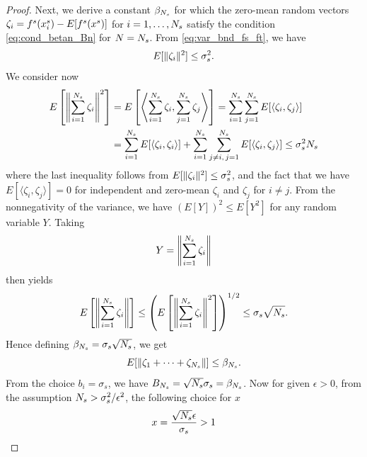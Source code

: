 \documentclass[review,supplement,onefignum,onetabnum]{siamonline250211}
\begin{document}
\begin{proof}
Next, we derive a constant $\beta_{N_s}$ for which the zero-mean random vectors $\zeta_i = f^s(x^s_i)- E[f^s(x^s)]$ for $i=1, \dots, N_s$ satisfy the condition \eqref{eq:cond_betan_Bn} for $N=N_s$. From \eqref{eq:var_bnd_fs_ft}, we have
%
\begin{equation*}
E[ \| \zeta_i  \|^2 ] \leq \sigma_s^2.
\end{equation*}
%
We consider now
%
\begin{equation*}
\begin{split}
E\left[ \left  \|   \sum_{i=1}^{N_s} \zeta_i   \right \|^2
\right]
&= E\left[ \left \langle  \sum_{i=1}^{N_s} \zeta_i ,  
\sum_{j=1}^{N_s} \zeta_j   \right \rangle
\right]
= \sum_{i=1}^{N_s} \sum_{j=1}^{N_s}  E[ \langle \zeta_i, \zeta_j  \rangle ]  \\
&= \sum_{i=1}^{N_s} E[ \langle \zeta_i, \zeta_i  \rangle ] 
+   \sum_{i=1}^{N_s} \sum_{j \neq i, \, j=1}^{N_s} E[ \langle \zeta_i, \zeta_j  \rangle ] 
 \leq \sigma_s^2 N_s
\end{split}
\end{equation*}
%
where the last inequality follows from $E[ \| \zeta_i  \|^2 ] \leq \sigma_s^2$, and the fact that we have $E[ \langle \zeta_i, \zeta_j  \rangle ] =0$ for independent and zero-mean $\zeta_i$ and $\zeta_j$ for $i \neq j$.
%
From the nonnegativity of the variance, we have $(E[Y])^2 \leq E[Y^2]$ for any random variable $Y$. Taking 
%
\begin{equation*}
Y= \left  \|  \sum_{i=1}^{N_s} \zeta_i   \right \|
\end{equation*}
%
then yields
%
\begin{equation*}
\begin{split}
E\left[ \left  \|   \sum_{i=1}^{N_s} \zeta_i   \right \|  
\right]
\leq
\left( 
E\left[ \left  \|  \sum_{i=1}^{N_s} \zeta_i   \right \|^2
\right]
\right)^{1/2}
\leq 
\sigma_s \sqrt{N_s}.
\end{split}
\end{equation*}
%
%
Hence defining $\beta_{N_s} = \sigma_s \sqrt{N_s}$, we get 
 \begin{equation}
 \label{eq:exp_sum_zetai}
 E[  \| \zeta_1 + \dots + \zeta_{N_s} \|] \leq \beta_{N_s}.
 \end{equation}
From the choice $b_i=\sigma_s$, we have $B_{N_s}=\sqrt{N_s} \sigma_s = \beta_{N_s}$. Now for given $\epsilon>0$, from the assumption $N_s > \sigma_s^2 / \epsilon^2$, the following choice for $x$ 
%
\begin{equation*}
x=\frac{\sqrt{N_s} \epsilon}{\sigma_s} > 1
\end{equation*}

\end{proof}
\end{document}
